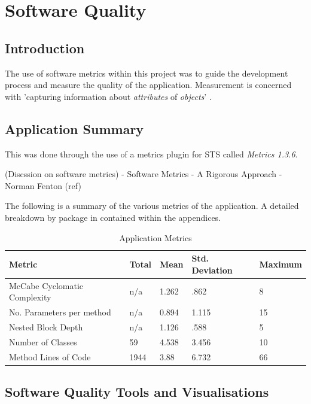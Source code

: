 \chapter{Software Quality}
\label{squality}

\section{Introduction}

The use of software metrics within this project was to guide the development process and measure the quality of the application. Measurement is concerned with 'capturing information about \textit{attributes} of \textit{objects}' \parencite{softmetrics}.

\section{Application Summary}

 This was done through the use of a metrics plugin for STS called \textit{Metrics 1.3.6}. 

(Discssion on software metrics)
- Software Metrics - A Rigorous Approach - Norman Fenton (ref)

The following is a summary of the various metrics of the application. A detailed breakdown by package in contained within the appendices.

\begin{table}[H]
\begin{center}
    \begin{tabular}{| l | l | l | l | p{2.3cm} |}
    \hline
    Metric & Total & Mean & Std. Deviation & Maximum\\ \hline
	McCabe Cyclomatic Complexity & n/a & 1.262 & .862 & 8\\ \hline
	No. Parameters per method & n/a & 0.894 & 1.115 & 15\\ \hline
	Nested Block Depth & n/a & 1.126 & .588 & 5\\ \hline
	Number of Classes & 59 & 4.538 & 3.456 & 10\\ \hline
	Method Lines of Code& 1944 & 3.88 & 6.732 & 66\\ \hline

    \end{tabular}
\end{center}
\caption{Application Metrics}
\end{table}


\section{Software Quality Tools and Visualisations}


